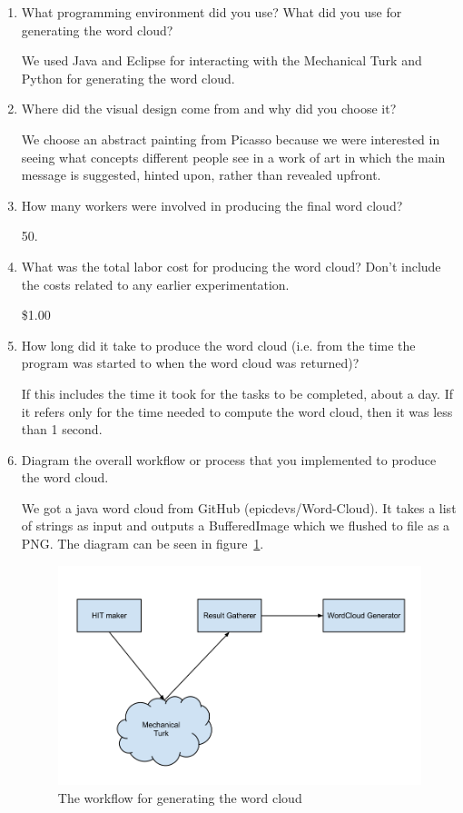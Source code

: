 \documentclass{article}
\begin{document}
\begin{enumerate}

\item What programming environment did you use? What did you use for generating the word cloud?

We used Java and Eclipse for interacting with the Mechanical Turk and Python for generating the word cloud.

\item Where did the visual design come from and why did you choose it?

We choose an abstract painting from Picasso because we were interested in seeing what concepts different people see in a work of art in which the main message is suggested, hinted upon, rather than revealed upfront.

\item How many workers were involved in producing the final word cloud?

50.

\item What was the total labor cost for producing the word cloud? Don't include the costs related to any earlier experimentation.

\$1.00

\item How long did it take to produce the word cloud (i.e. from the time the program was started to when the word cloud was returned)?

If this includes the time it took for the tasks to be completed, about  a day. If it refers only for the time needed to compute the word cloud, then it was less than 1 second.

\item Diagram the overall workflow or process that you implemented to produce the word cloud.

We got a java word cloud from GitHub (epicdevs/Word-Cloud). It takes a list of strings as input and outputs a BufferedImage which we flushed to file as a PNG. The diagram can be seen in figure~\ref{fig:workflow}.

\begin{figure}
	\includegraphics[width=\textwidth]{workflow.png}
\caption{The workflow for generating the word cloud}
\label{fig:workflow}
\end{figure}


\end{enumerate}
\end{document}
